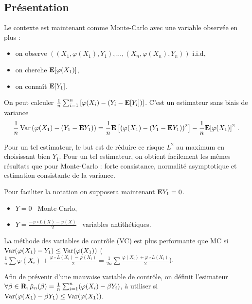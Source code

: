 \subsection{Présentation}

	Le contexte est maintenant comme Monte-Carlo avec une variable observée en plus :
	\begin{itemize}
		\item[\textbullet] on observe $((X_1,\varphi(X_1),Y_1), \ldots, (X_n,\varphi(X_n),Y_n))$ i.i.d,
		\item[\textbullet] on cherche $\mathbf{E} [\varphi(X_1)]$,
		\item[\textbullet] on connaît $\mathbf{E} [Y_1]$.
	\end{itemize}
	
	On peut calculer $\frac{1}{n} \sum_{i = 1}^n \left[ \varphi(X_i) - (Y_i - \mathbf{E}[Y_i]) \right]$.
	C'est un estimateur sans biais de variance
	$$\frac{1}{n} \operatorname{Var} \left( \varphi(X_1) - (Y_1 - \mathbf{E} Y_1) \right) = \frac{1}{n} \mathbf{E} \left[ (\varphi(X_1) - (Y_1 - \mathbf{E} Y_1))^2 \right] - \frac{1}{n} \mathbf{E}[\varphi(X_1)]^2\ .$$
	
	Pour un tel estimateur, le but est de réduire  ce risque $L^2$ au maximum en choisissant bien $Y_1$.
	Pour un tel estimateur, on obtient facilement les mêmes résultats que pour Monte-Carlo : forte consistance, normalité asymptotique et estimation consistante de la variance.
	
	Pour faciliter la notation on supposera maintenant $\mathbf{E} Y_1 = 0$.
	
	\begin{rem}
		\begin{itemize}
			\item[\textbullet] $Y = 0$ \textrightarrow\ Monte-Carlo,
			\item[\textbullet] $Y = \frac{- \varphi \circ L(X) - \varphi(X)}{2}$ \textrightarrow\ variables antithétiques.
		\end{itemize}
	\end{rem}
	
	\begin{rem}
		La méthode des variables de contrôle (VC) est plus performante que MC si $\operatorname{Var}(\varphi(X_1) - Y_1) \leq \operatorname{Var}(\varphi(X_1))$ ($\frac{1}{n} \sum \varphi(X_i) + \frac{\varphi \circ L(X_i) - \varphi(X_i)}{2} = \frac{1}{2n} \sum \frac{\varphi(X_i) + \varphi \circ L(X_i)}{2}$).
	\end{rem}
	
	Afin de prévenir d'une mauvaise variable de contrôle, on définit l'esimateur $\forall \beta \in \mathbf{R}, \hat{\mu}_n(\beta) = \frac{1}{n} \sum_{i = 1}^n (\varphi(X_i) - \beta Y_i)$, à utiliser si $\operatorname{Var}(\varphi(X_1) - \beta Y_1) \leq \operatorname{Var}(\varphi(X_1))$.
	
